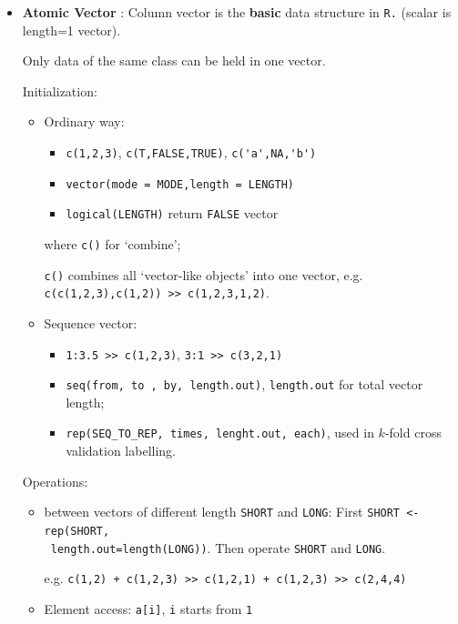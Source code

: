 \begin{itemize}[topsep=2pt,itemsep=0pt]
    \item \textbf{Atomic Vector} : Column vector is the \textbf{basic} data structure in \lstinline|R.| (scalar is length=1 vector).
    
    Only data of the same class can be held in one vector.
    
    Initialization:
    \begin{itemize}[topsep=2pt,itemsep=0pt]
        \item Ordinary way: 
        \begin{itemize}[topsep=2pt,itemsep=0pt]
            \item \lstinline|c(1,2,3)|, \lstinline|c(T,FALSE,TRUE)|, \lstinline|c('a',NA,'b')|
            \item \lstinline|vector(mode = MODE,length = LENGTH)|
            \item \lstinline|logical(LENGTH)| return \lstinline|FALSE| vector 
        \end{itemize}
        
        where \lstinline|c()| for `combine'; 
        
        \lstinline|c()| combines all `vector-like objects' into one vector, e.g. \lstinline|c(c(1,2,3),c(1,2)) >> c(1,2,3,1,2)|.
        \item Sequence vector: 
        \begin{itemize}[topsep=2pt,itemsep=0pt]
            \item \lstinline|1:3.5 >> c(1,2,3)|, \lstinline|3:1 >> c(3,2,1)|
            \item \lstinline|seq(from, to , by, length.out)|, \lstinline|length.out| for total vector length;
            \item \lstinline|rep(SEQ_TO_REP, times, lenght.out, each)|, used in $ k $-fold cross validation labelling.
        \end{itemize}
    \end{itemize}
    
    Operations:
    \begin{itemize}[topsep=2pt,itemsep=0pt]
        \item between vectors of different length \lstinline|SHORT| and \lstinline|LONG|: First \lstinline|SHORT <- rep(SHORT,|\\\lstinline| length.out=length(LONG))|. Then operate \lstinline|SHORT| and \lstinline|LONG|.
        
        e.g.
        \lstinline|c(1,2) + c(1,2,3) >> c(1,2,1) + c(1,2,3) >> c(2,4,4)|
        \item Element access: \lstinline|a[i]|, \lstinline|i| starts from \lstinline|1|
    \end{itemize}
    

\end{itemize}
